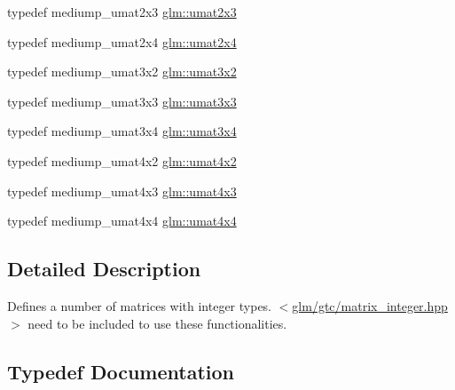 \begin{DoxyCompactItemize}
\item 
typedef mediump\+\_\+umat2x3 \hyperlink{group__gtc__matrix__integer_ga890ae28f9230794138b2c89f44ce3376}{glm\+::umat2x3}
\item 
typedef mediump\+\_\+umat2x4 \hyperlink{group__gtc__matrix__integer_ga3b23b164240cf4dfb429776da7be9d88}{glm\+::umat2x4}
\item 
typedef mediump\+\_\+umat3x2 \hyperlink{group__gtc__matrix__integer_ga257300f2710612877ef45438a366e308}{glm\+::umat3x2}
\item 
typedef mediump\+\_\+umat3x3 \hyperlink{group__gtc__matrix__integer_gab80b6501ba1b2c40119a0f2d256f4c97}{glm\+::umat3x3}
\item 
typedef mediump\+\_\+umat3x4 \hyperlink{group__gtc__matrix__integer_ga5410857d098a989a30b4017100bc2ff7}{glm\+::umat3x4}
\item 
typedef mediump\+\_\+umat4x2 \hyperlink{group__gtc__matrix__integer_ga13e8392218e9b6e1b7f194a21b5c88bf}{glm\+::umat4x2}
\item 
typedef mediump\+\_\+umat4x3 \hyperlink{group__gtc__matrix__integer_ga08373f5588a54da1a48e5e55c7d51004}{glm\+::umat4x3}
\item 
typedef mediump\+\_\+umat4x4 \hyperlink{group__gtc__matrix__integer_gae0931b79e808fb0983848778a60eb548}{glm\+::umat4x4}
\end{DoxyCompactItemize}


\subsection{Detailed Description}
Defines a number of matrices with integer types. $<$\hyperlink{matrix__integer_8hpp}{glm/gtc/matrix\+\_\+integer.\+hpp}$>$ need to be included to use these functionalities. 

\subsection{Typedef Documentation}
\hypertarget{group__gtc__matrix__integer_gae1cd6ff099593d2f215bd4ceed538200}{}
